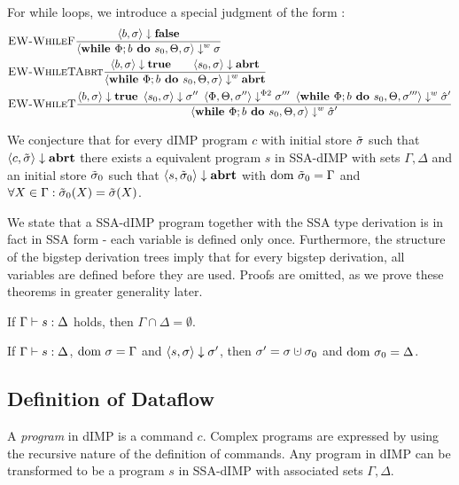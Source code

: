 For while loops, we introduce a special judgment of the form :
\begin{align*}
    &\textsc{EW-WhileF}\frac{\displaystyle \langle b, \sigma \rangle \downarrow \textbf{false}}{\displaystyle \langle \textbf{while }\Phi;{b} \textbf{ do } {s_0}, \Theta, \sigma \rangle \downarrow^w \sigma}\qquad\\
    &\textsc{EW-WhileTAbrt}\frac{\displaystyle \langle b, \sigma \rangle \downarrow \textbf{true} \qquad 
    \langle s_0, \sigma \rangle \downarrow \textbf{abrt}}{\displaystyle \langle \textbf{while }\Phi;{b} \textbf{ do } {s_0}, \Theta, \sigma \rangle \downarrow^w \textbf{abrt}}\\
    &\textsc{EW-WhileT}\frac{\displaystyle \langle b, \sigma \rangle \downarrow \textbf{true} \enskip
    \langle s_0, \sigma \rangle \downarrow \sigma'' \enskip
    \langle \Phi, \Theta, \sigma'' \rangle \downarrow^{\Phi2} \sigma''' \enskip
    \langle \textbf{while }\Phi;{b} \textbf{ do } {s_0}, \Theta, \sigma''' \rangle \downarrow^w \hat{\sigma}'}{\displaystyle \langle \textbf{while }\Phi;{b} \textbf{ do } {s_0}, \Theta, \sigma \rangle \downarrow^w \hat{\sigma}'}
\end{align*}
\begin{conjecture}
    We conjecture that for every dIMP program $c$ with initial store $\tilde{\sigma}$
    such that $\langle c, \tilde{\sigma} \rangle \downarrow \textbf{abrt}$ there exists a equivalent program
    $s$ in SSA-dIMP with sets $\Gamma, \Delta$ and an initial store $\tilde{\sigma}_0$ such that
     $\langle s, \tilde{\sigma}_0 \rangle \downarrow \textbf{abrt}$ with
    $\text{dom }{\tilde{\sigma}_0} = \Gamma$ and $\forall X \in \Gamma: \tilde{\sigma}_0(X) = \tilde{\sigma}(X)$.
\end{conjecture}

We state that a SSA-dIMP program together with the SSA type derivation
is in fact in SSA form - each variable is defined only once.
Furthermore, the structure of the bigstep derivation trees imply that 
for every bigstep derivation, all variables are defined before they are used.
Proofs are omitted, as we prove these theorems in greater generality later.

\begin{theorem}
    If $\Gamma \vdash {s}: \Delta$ holds, then $\Gamma \cap \Delta = \emptyset$.
\end{theorem}

\begin{theorem}
    If $\Gamma \vdash {s}: \Delta$, $\text{dom } \sigma = \Gamma$ and
    $\langle s, \sigma \rangle \downarrow \sigma'$, then $\store' = \store \dunion \store_0$
    and $\text{dom }{\sigma_0} = \Delta$.
\end{theorem}

\subsection{Definition of Dataflow}
\begin{definition}[Program]
    A \emph{program} in dIMP is a command $c$.
    Complex programs are expressed by using the recursive nature of
    the definition of commands.
    Any program in dIMP can be transformed to be a program $s$ in SSA-dIMP with associated
    sets $\Gamma, \Delta$.
\end{definition}

